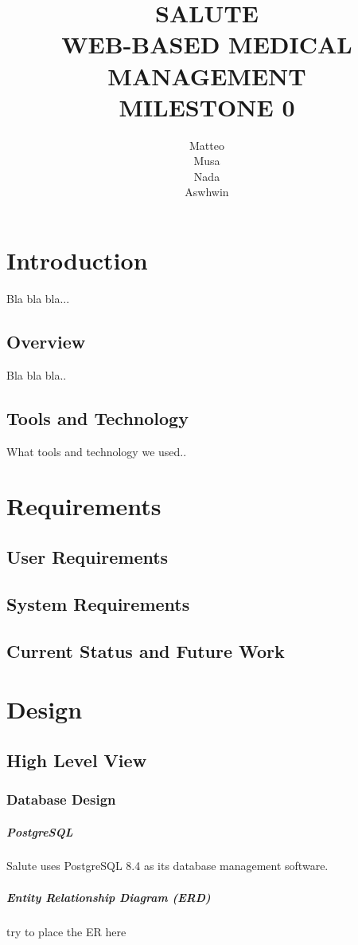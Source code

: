 \documentclass[12pt]{report}
\title{SALUTE \\ WEB-BASED MEDICAL MANAGEMENT \\ MILESTONE 0}
\author{Matteo \\ Musa \\ Nada \\ Aswhwin}
\begin{document}
\maketitle
\tableofcontents


\chapter{Introduction}
Bla bla bla...
\section{Overview}
Bla bla bla..
\section{Tools and Technology}
What tools and technology we used..


\chapter{Requirements}
\section{User Requirements}
\section{System Requirements}
\section{Current Status and Future Work}


\chapter{Design}
\section{High Level View}
\subsection{Database Design}
\paragraph{PostgreSQL}
Salute uses PostgreSQL 8.4 as its database management software.
\paragraph{Entity Relationship Diagram (ERD)}
try to place the ER here
\end{document}

